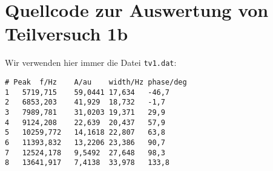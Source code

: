 
\section{\gnuplot{} Quellcode zur Auswertung von Teilversuch 1b}
    Wir verwenden hier immer die Datei \texttt{tv1.dat}:
        \begin{verbatim}
# Peak  f/Hz    A/au    width/Hz phase/deg
1   5719,715    59,0441 17,634   -46,7
2   6853,203    41,929  18,732   -1,7
3   7989,781    31,0203 19,371   29,9
4   9124,208    22,639  20,437   57,9
5   10259,772   14,1618 22,807   63,8
6   11393,832   13,2206 23,386   90,7
7   12524,178   9,5492  27,648   98,3
8   13641,917   7,4138  33,978   133,8
        \end{verbatim}
    
    